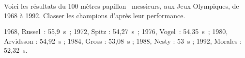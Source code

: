 Voici les résultats du 100 mètres papillon \og messieurs\fg, aux Jeux
Olympiques, de 1968 à 1992. Classer les champions d'après leur
performance.
\par 1968, Russel : 55,9~s ; 1972, Spitz : 54,27~s ; 1976, Vogel :
54,35~s ; 1980, Arvidsson : 54,92~s ; 1984, Gross : 53,08~s ; 1988,
Nesty : 53~s ; 1992, Morales : 52,32~s.
